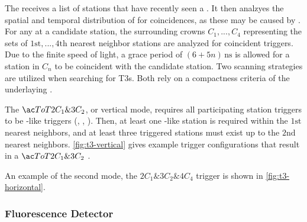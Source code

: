 The \CDAS receives a list of stations that have recently seen a \TTWO. It then
analzyes the spatial and temporal distribution of \TTWOs for coincidences, as 
these may be caused by \EASs. For any \TTWO at a candidate station, the 
surrounding crowns $C_1, ..., C_4$ representing the sets of  
$1\mathrm{st}, ..., 4\mathrm{th}$ nearest neighbor stations are analyzed for 
coincident \TTWO triggers. Due to the finite speed of light, a grace period of 
$(6 + 5n)\,\mathrm{ns}$ is allowed for a station in $C_n$ to be coincident with
the candidate station. Two scanning strategies are utilized when searching 
for \acfp{T3}. Both rely on a compactness criteria of the underlaying \TTWOs.

The $\ToT2C_1\&3C_2$, or vertical mode, requires all participating station 
triggers to be \ToT-like triggers (\ToT, \ToTd, \MoPS). Then, at least one 
\ToT-like station is required within the $1\mathrm{st}$ nearest neighbors, and
at least three triggered stations must exist up to the $2\mathrm{nd}$ nearest
neighbors. \cref{fig:t3-vertical} gives example trigger configurations that 
result in a $\ToT2C_1\&3C_2$ \TTHREE.

An example of the second mode, the $2C_1\&3C_2\&4C_4$ \TTHREE trigger is shown
in \cref{fig:t3-horizontal}. 

\subsubsection{Fluorescence Detector}

